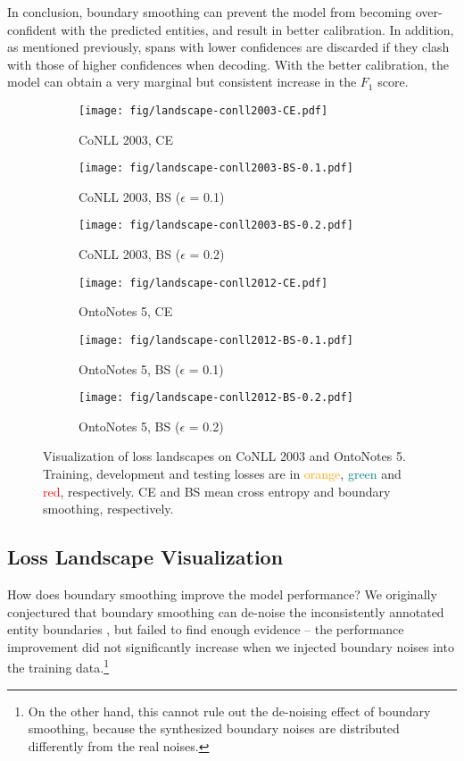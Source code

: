 \documentclass[11pt]{article}
\begin{document}
In conclusion, boundary smoothing can prevent the model from becoming over-confident with the predicted entities, and result in better calibration. In addition, as mentioned previously, spans with lower confidences are discarded if they clash with those of higher confidences when decoding. With the better calibration, the model can obtain a very marginal but consistent increase in the $F_1$ score. 




\begin{figure*}[t]
    \centering
    \begin{subfigure}{0.3\textwidth}
    \centering
    \texttt{[image: fig/landscape-conll2003-CE.pdf]}
    \caption{CoNLL 2003, CE}
    \end{subfigure}
    \begin{subfigure}{0.3\textwidth}
    \centering
    \texttt{[image: fig/landscape-conll2003-BS-0.1.pdf]}
    \caption{CoNLL 2003, BS ($\epsilon$ = 0.1)}
    \end{subfigure}
    \begin{subfigure}{0.3\textwidth}
    \centering
    \texttt{[image: fig/landscape-conll2003-BS-0.2.pdf]}
    \caption{CoNLL 2003, BS ($\epsilon$ = 0.2)}
    \end{subfigure}
    \begin{subfigure}{0.3\textwidth}
    \centering
    \texttt{[image: fig/landscape-conll2012-CE.pdf]}
    \caption{OntoNotes 5, CE}
    \end{subfigure}
    \begin{subfigure}{0.3\textwidth}
    \centering
    \texttt{[image: fig/landscape-conll2012-BS-0.1.pdf]}
    \caption{OntoNotes 5, BS ($\epsilon$ = 0.1)}
    \end{subfigure}
    \begin{subfigure}{0.3\textwidth}
    \centering
    \texttt{[image: fig/landscape-conll2012-BS-0.2.pdf]}
    \caption{OntoNotes 5, BS ($\epsilon$ = 0.2)}
    \end{subfigure}
    \caption{Visualization of loss landscapes on CoNLL 2003 and OntoNotes 5. Training, development and testing losses are in \textcolor{orange}{orange}, \textcolor{teal}{green} and \textcolor{red}{red}, respectively. CE and BS mean cross entropy and boundary smoothing, respectively.}
    \label{fig:landscape}
\end{figure*}


\subsection{Loss Landscape Visualization}
How does boundary smoothing improve the model performance? We originally conjectured that boundary smoothing can de-noise the inconsistently annotated entity boundaries \citep{lukasik2020does}, but failed to find enough evidence -- the performance improvement did not significantly increase when we injected boundary noises into the training data.\footnote{On the other hand, this cannot rule out the de-noising effect of boundary smoothing, because the synthesized boundary noises are distributed differently from the real noises.} 
\end{document}
